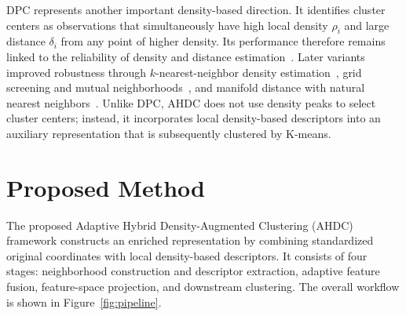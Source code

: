 \documentclass[10pt,twoside]{article}
\numberwithin{equation}{section}
\begin{document}
DPC represents another important density-based direction. It identifies cluster centers as observations that simultaneously have high local density $\rho_i$ and large distance $\delta_i$ from any point of higher density. Its performance therefore remains linked to the reliability of density and distance estimation~\cite{Rodriguez2014}. Later variants improved robustness through $k$-nearest-neighbor density estimation~\cite{Du2016}, grid screening and mutual neighborhoods~\cite{Chen2022}, and manifold distance with natural nearest neighbors~\cite{Wang2025}. Unlike DPC, AHDC does not use density peaks to select cluster centers; instead, it incorporates local density-based descriptors into an auxiliary representation that is subsequently clustered by K-means.



\section{Proposed Method}

The proposed Adaptive Hybrid Density-Augmented Clustering (AHDC) framework constructs an enriched representation by combining standardized original coordinates with local density-based descriptors. It consists of four stages: neighborhood construction and descriptor extraction, adaptive feature fusion, feature-space projection, and downstream clustering. The overall workflow is shown in Figure~\ref{fig:pipeline}.
\end{document}
